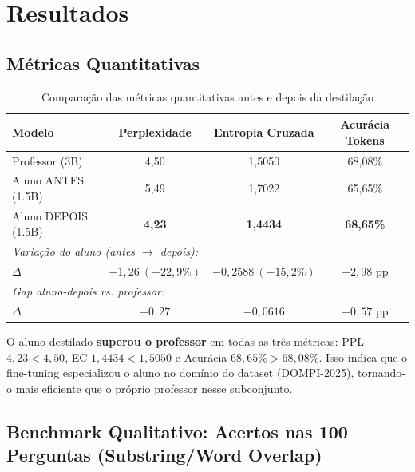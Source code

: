 \documentclass[12pt, a4paper]{article}
\begin{document}
\section{Resultados}

\subsection{Métricas Quantitativas}

\begin{table}[H]
\centering
\caption{Comparação das métricas quantitativas antes e depois da destilação}
\begin{tabular}{lccc}
\toprule
\textbf{Modelo} & \textbf{Perplexidade} & \textbf{Entropia Cruzada} & \textbf{Acurácia Tokens} \\
\midrule
\rowcolor{lightblue}
Professor (3B)    & 4,50 & 1,5050 & 68,08\% \\
Aluno ANTES (1.5B) & 5,49 & 1,7022 & 65,65\% \\
\rowcolor{lightgreen}
Aluno DEPOIS (1.5B) & \textbf{4,23} & \textbf{1,4434} & \textbf{68,65\%} \\
\midrule
\multicolumn{4}{l}{\textit{Variação do aluno (antes $\rightarrow$ depois):}} \\
$\Delta$ & $-1,26\ (-22{,}9\%)$ & $-0,2588\ (-15{,}2\%)$ & $+2,98$ pp \\
\multicolumn{4}{l}{\textit{Gap aluno-depois vs. professor:}} \\
$\Delta$ & $-0,27$ & $-0,0616$ & $+0,57$ pp \\
\bottomrule
\end{tabular}
\end{table}

\begin{successbox}
O aluno destilado \textbf{superou o professor} em todas as três métricas:
PPL $4{,}23 < 4{,}50$, EC $1{,}4434 < 1{,}5050$ e Acurácia $68{,}65\% > 68{,}08\%$.
Isso indica que o fine-tuning especializou o aluno no domínio do dataset (DOMPI-2025),
tornando-o mais eficiente que o próprio professor nesse subconjunto.
\end{successbox}

\subsection{Benchmark Qualitativo: Acertos nas 100 Perguntas (Substring/Word Overlap)}
\end{document}
